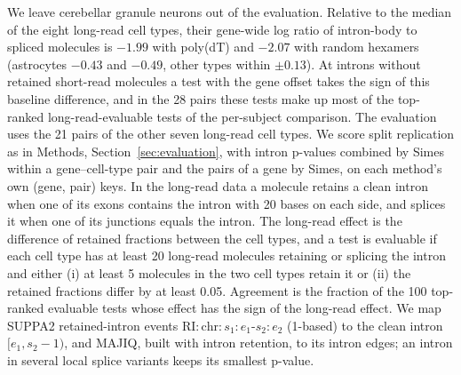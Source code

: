 \documentclass[11pt]{article}
\begin{document}
We leave cerebellar granule neurons out of the evaluation. Relative to the median of the eight long-read cell types, their gene-wide log ratio of intron-body to spliced molecules is $-1.99$ with poly(dT) and $-2.07$ with random hexamers (astrocytes $-0.43$ and $-0.49$, other types within $\pm0.13$). At introns without retained short-read molecules a test with the gene offset takes the sign of this baseline difference, and in the 28 pairs these tests make up most of the top-ranked long-read-evaluable tests of the per-subject comparison. The evaluation uses the 21 pairs of the other seven long-read cell types. We score split replication as in Methods, Section~\ref{sec:evaluation}, with intron p-values combined by Simes within a gene--cell-type pair and the pairs of a gene by Simes, on each method's own (gene, pair) keys. In the long-read data a molecule retains a clean intron when one of its exons contains the intron with 20 bases on each side, and splices it when one of its junctions equals the intron. The long-read effect is the difference of retained fractions between the cell types, and a test is evaluable if each cell type has at least 20 long-read molecules retaining or splicing the intron and either (i) at least 5 molecules in the two cell types retain it or (ii) the retained fractions differ by at least 0.05. Agreement is the fraction of the 100 top-ranked evaluable tests whose effect has the sign of the long-read effect. We map SUPPA2 retained-intron events $\mathrm{RI}{:}\mathrm{chr}{:}s_1{:}e_1\text{-}s_2{:}e_2$ (1-based) to the clean intron $[e_1,s_2-1)$, and MAJIQ, built with intron retention, to its intron edges; an intron in several local splice variants keeps its smallest p-value.
\end{document}
